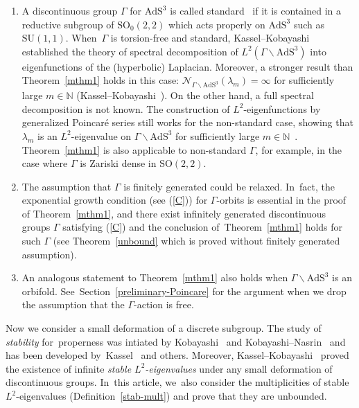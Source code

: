 \documentclass[10pt,a4paper]{amsart}
\numberwithin{equation}{section}
\begin{document}
\begin{Remark}\quad
\begin{enumerate} \itemsep=0pt
\item[(1)]
A discontinuous group $\Gamma$ for $\mathrm{AdS}^{3}$
is called standard~\cite[Definition~1.4]{KaKob16} if
it is contained in a reductive subgroup of $\mathrm{SO}_{0}(2,2)$
which acts properly on $\mathrm{AdS}^{3}$ such as $\mathrm{SU}(1,1)$.
When~$\Gamma$ is torsion-free and standard,
Kassel--Kobayashi~\cite{KaKob19,KaKob20PJA} established the theory of spectral decomposition
of $L^{2}(\Gamma\backslash\mathrm{AdS}^{3})$ into eigenfunctions of the (hyperbolic) Laplacian.
Moreover, a stronger result than Theorem~\ref{mthm1} holds in this case:
$\mathcal{N}_{\Gamma\backslash\mathrm{AdS}^{3}}(\lambda_{m}) = \infty$
for sufficiently large $m \in \mathbb{N}$ (Kassel--Kobayashi~\cite{AnaKaKob}).
On the other hand, a full spectral decomposition is not known.
The construction of $L^{2}$-eigenfunctions by generalized Poincar\'e series still works for
the non-standard case, showing that $\lambda_{m}$ is an $L^{2}$-eigenvalue on
$\Gamma\backslash\mathrm{AdS}^{3}$ for sufficiently large $m\in\mathbb{N}$~\cite{KaKob16}.
Theorem~\ref{mthm1} is also applicable to non-standard $\Gamma$,
for example, in the case where $\Gamma$ is Zariski dense in $\mathrm{SO}(2,2)$.

\item[(2)]
The assumption that $\Gamma$ is finitely generated could be relaxed. In~fact, the exponential growth condition (see (\ref{C})) for
$\Gamma$-orbits is essential in the proof of Theorem~\ref{mthm1},
and there exist infinitely generated discontinuous groups $\Gamma$ satisfying (\ref{C})
and the conclusion of~Theorem~\ref{mthm1} holds for such $\Gamma$
(see Theorem~\ref{unbound} which is proved without finitely generated assumption).

\item[(3)]
An analogous statement to Theorem~\ref{mthm1} also holds when
$\Gamma\backslash\mathrm{AdS}^{3}$ is an orbifold.
See~Section~\ref{preliminary-Poincare} for the argument when
we drop the assumption that the $\Gamma$-action is free.
\end{enumerate}
\end{Remark}

Now we consider a small deformation of a discrete subgroup.
The study of \textit{stability} for~pro\-pe\-rness
was intiated by Kobayashi~\cite{Kob98} and Kobayashi--Nasrin~\cite{KoNa06}
and has been developed
by~Kassel~\cite{Ka12} and others.
Moreover, Kassel--Kobayashi~\cite{KaKob16} proved
the existence of infinite \textit{stable $L^2$-eigenvalues}
under any small deformation of discontinuous groups. In~this article, we~also consider
the multiplicities of stable $L^2$-eigenvalues (Definition~\ref{stab-mult})
and prove that they are unbounded.
\end{document}
